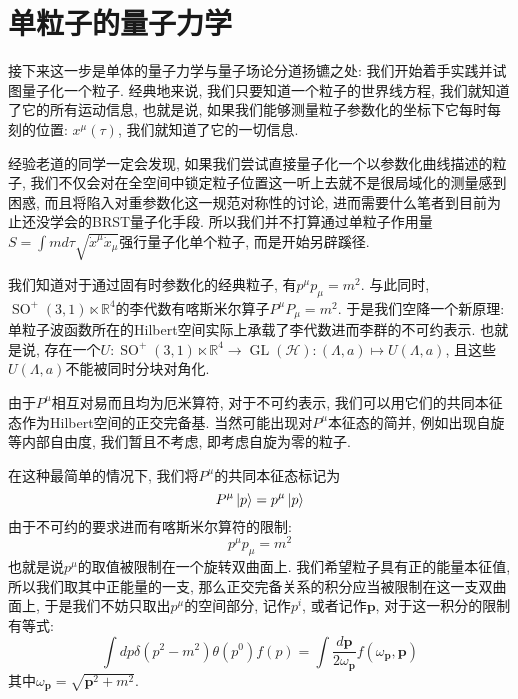 \section{单粒子的量子力学}
接下来这一步是单体的量子力学与量子场论分道扬镳之处: 我们开始着手实践并试图量子化一个粒子. 经典地来说, 我们只要知道一个粒子的世界线方程, 我们就知道了它的所有运动信息, 也就是说, 如果我们能够测量粒子参数化的坐标下它每时每刻的位置: $x^\mu(\tau)$, 我们就知道了它的一切信息.\par
\begin{remark}
    经验老道的同学一定会发现, 如果我们尝试直接量子化一个以参数化曲线描述的粒子, 我们不仅会对在全空间中锁定粒子位置这一听上去就不是很局域化的测量感到困惑, 而且将陷入对重参数化这一规范对称性的讨论, 进而需要什么笔者到目前为止还没学会的BRST量子化手段. 所以我们并不打算通过单粒子作用量$S=\int md\tau \sqrt{\dot{x}^\mu\dot{x}_\mu}$强行量子化单个粒子, 而是开始另辟蹊径.
\end{remark}
我们知道对于通过固有时参数化的经典粒子, 有$p^\mu p_\mu=m^2$. 与此同时, $\operatorname{SO}^+(3, 1)\ltimes\mathbb{R}^4$的李代数有喀斯米尔算子$P^\mu P_\mu=m^2$. 于是我们空降一个新原理: 单粒子波函数所在的Hilbert空间实际上承载了李代数进而李群的不可约表示. 也就是说, 存在一个$U: \operatorname{SO}^+(3, 1)\ltimes\mathbb{R}^4\rightarrow\operatorname{GL}(\mathcal{H}):(\Lambda,a)\mapsto U(\Lambda,a)$, 且这些$U(\Lambda,a)$不能被同时分块对角化.\par
由于$P^\mu$相互对易而且均为厄米算符, 对于不可约表示, 我们可以用它们的共同本征态作为Hilbert空间的正交完备基. 当然可能出现对$P^\mu$本征态的简并, 例如出现自旋等内部自由度, 我们暂且不考虑, 即考虑自旋为零的粒子.\par
在这种最简单的情况下, 我们将$P^\mu$的共同本征态标记为
\begin{equation}
    P^\mu\ket{p}=p^\mu\ket{p}
\end{equation}
由于不可约的要求进而有喀斯米尔算符的限制:
\begin{equation}
    p^\mu p_\mu=m^2
\end{equation}
也就是说$p^\mu$的取值被限制在一个旋转双曲面上. 我们希望粒子具有正的能量本征值, 所以我们取其中正能量的一支, 那么正交完备关系的积分应当被限制在这一支双曲面上, 于是我们不妨只取出$p^\mu$的空间部分, 记作$p^i$, 或者记作$\mathbf{p}$, 对于这一积分的限制有等式:
\begin{equation}
    \int dp\delta(p^2-m^2)\theta(p^0)f(p)=\int \frac{d\mathbf{p}}{2\omega_\mathbf{p}}f(\omega_\mathbf{p}, \mathbf{p})
\end{equation}
其中$\omega_\mathbf{p}=\sqrt{\mathbf{p}^2+m^2}$.

